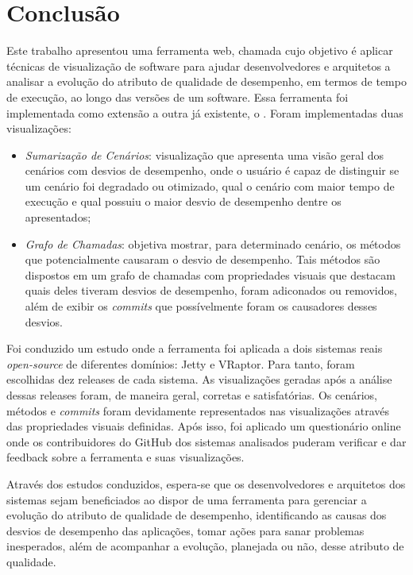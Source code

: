 \chapter{Conclusão} \label{ch:conclusao}

Este trabalho apresentou uma ferramenta web, chamada \textit{\toolName} cujo objetivo é aplicar técnicas de visualização de software para ajudar desenvolvedores e arquitetos a analisar a evolução do atributo de qualidade de desempenho, em termos de tempo de execução, ao longo das versões de um software. Essa ferramenta foi implementada como extensão a outra já existente, o \textit{\perfMinerName}. Foram implementadas duas visualizações:
\begin{itemize}
	\item \textit{Sumarização de Cenários}: visualização que apresenta uma visão geral dos cenários com desvios de desempenho, onde o usuário é capaz de distinguir se um cenário foi degradado ou otimizado, qual o cenário com maior tempo de execução e qual possuiu o maior desvio de desempenho dentre os apresentados;
	\item \textit{Grafo de Chamadas}: objetiva mostrar, para determinado cenário, os métodos que potencialmente causaram o desvio de desempenho. Tais métodos são dispostos em um grafo de chamadas com propriedades visuais que destacam quais deles tiveram desvios de desempenho, foram adiconados ou removidos, além de exibir os \textit{commits} que possívelmente foram os causadores desses desvios.
\end{itemize}

Foi conduzido um estudo onde a ferramenta foi aplicada a dois sistemas reais \textit{open-source} de diferentes domínios: Jetty e VRaptor. Para tanto, foram escolhidas dez releases de cada sistema. As visualizações geradas após a análise dessas releases foram, de maneira geral, corretas e satisfatórias. Os cenários, métodos e \textit{commits} foram devidamente representados nas visualizações através das propriedades visuais definidas. Após isso, foi aplicado um questionário online onde os contribuidores do GitHub dos sistemas analisados puderam verificar e dar feedback sobre a ferramenta e suas visualizações.

Através dos estudos conduzidos, espera-se que os desenvolvedores e arquitetos dos sistemas sejam beneficiados ao dispor de uma ferramenta para gerenciar a evolução do atributo de qualidade de desempenho, identificando as causas dos desvios de desempenho das aplicações, tomar ações para sanar problemas inesperados, além de acompanhar a evolução, planejada ou não, desse atributo de qualidade.

